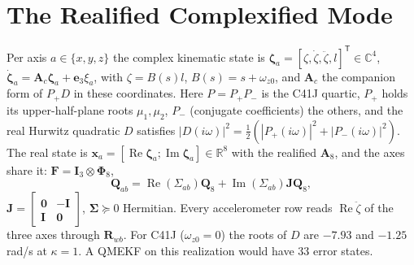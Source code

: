 \documentclass[conference]{IEEEtran}
\DeclareRobustCommand{\vct}[1]{\bm{#1}}
\DeclareRobustCommand{\mat}[1]{\bm{#1}}
\newcommand{\R}{\mathbb{R}}
\newcommand{\C}{\mathbb{C}}
\newcommand{\T}{^{\mathsf T}}
\renewcommand{\Re}{\operatorname{Re}}
\renewcommand{\Im}{\operatorname{Im}}
\theoremstyle{bodysmall}
\begin{document}
\section{The Realified Complexified Mode}
Per axis $a\in\{x,y,z\}$ the complex kinematic state is
$\vct\zeta_a=[\zeta,\dot\zeta,\ddot\zeta,l]\T\in\C^4$,
$\dot{\vct\zeta}_a=\mat A_c\vct\zeta_a+\vct e_3\xi_a$, with $\zeta=B(s)l$,
$B(s)=s+\omega_{z0}$, and $\mat A_c$ the companion form of $P_+D$ in these
coordinates. Here $P=P_+P_-$ is the C41J quartic, $P_+$ holds its
upper-half-plane roots $\mu_1,\mu_2$, $P_-$ (conjugate coefficients) the
others, and the real Hurwitz quadratic $D$ satisfies
$|D(i\omega)|^2=\tfrac12(|P_+(i\omega)|^2+|P_-(i\omega)|^2)$. The real state
is $\vct x_a=[\Re\vct\zeta_a;\Im\vct\zeta_a]\in\R^8$ with the realified
$\mat A_8$, and the axes share it: $\mat F=\mat I_3\otimes\mat\Phi_8$,
\begin{equation}
\mat Q_{ab}=\Re(\Sigma_{ab})\mat Q_8+\Im(\Sigma_{ab})\mat J\mat Q_8,
\label{eq:Q33}
\end{equation}
$\mat J=\left[\begin{smallmatrix}\mat0&-\mat I\\\mat I&\mat0\end{smallmatrix}\right]$,
$\mat\Sigma\succeq0$ Hermitian. Every accelerometer row reads $\Re\ddot\zeta$
of the three axes through $\mat R_{wb}$. For C41J ($\omega_{z0}=0$) the roots
of $D$ are $-7.93$ and $-1.25$\,rad/s at $\kappa=1$. A QMEKF on this
realization would have 33 error states.
\end{document}
